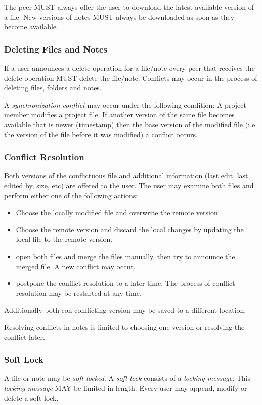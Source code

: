 The peer MUST always offer the user to download the latest available version of a file. New versions of notes MUST always be downloaded as soon as they become available.

\subsubsection{Deleting Files and Notes}
If a user announces a delete operation for a file/note every peer that receives the delete operation MUST delete the file/note. Conflicts may occur in the process of deleting files, folders and notes.

A \emph{synchronization conflict} may occur under the following condition: A project member modifies a project file. If another version of the same file becomes available that is newer (timestamp) then the base version of the modified file (i.e the version of the file before it was modified) a conflict occurs.

\subsubsection{Conflict Resolution}
Both versions of the conflictuous file and additional information (last edit, last edited by, size, etc) are offered to the user. The user may examine both files and perform either one of the following actions:
\begin{itemize}
\item Choose the locally modified file and overwrite the remote version.
\item Choose the remote version and discard the local changes by updating the local file to the remote version.
\item open both files and merge the files manually, then try to announce the merged file. A new conflict may occur.
\item postpone the conflict resolution to a later time. The process of conflict resolution may be restarted at any time.
\end{itemize}
Additionally both con conflicting version may be saved to a different location.

Resolving conflicts in notes is limited to choosing one version or resolving the conflict later.

\subsubsection{Soft Lock}
A file or note may be \emph{soft locked}. A \emph{soft lock} consists of a \emph{locking message}. This \emph{locking message} MAY be limited in length. Every user may append, modify or delete a soft lock. 

